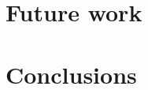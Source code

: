 \documentclass{aa}
\begin{document}
\section{Future work}
\section{Conclusions}




%
%



\end{document}
